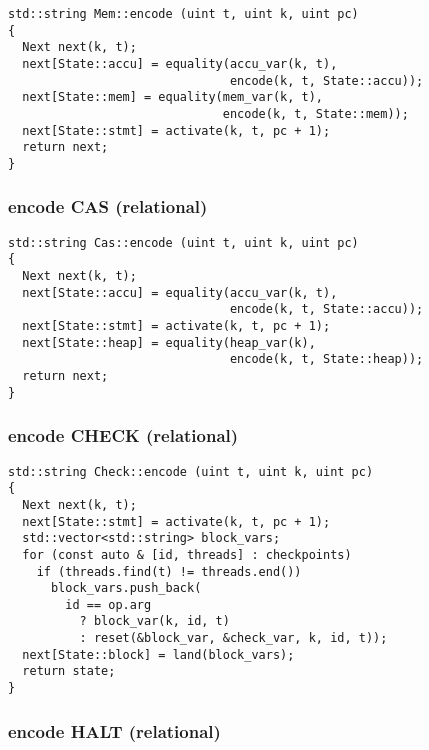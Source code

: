\begin{lstlisting}[style=c++]
std::string Mem::encode (uint t, uint k, uint pc)
{
  Next next(k, t);
  next[State::accu] = equality(accu_var(k, t),
                               encode(k, t, State::accu));
  next[State::mem] = equality(mem_var(k, t),
                              encode(k, t, State::mem));
  next[State::stmt] = activate(k, t, pc + 1);
  return next;
}
\end{lstlisting}

\subsubsection{encode CAS (relational)}

\begin{lstlisting}[style=c++]
std::string Cas::encode (uint t, uint k, uint pc)
{
  Next next(k, t);
  next[State::accu] = equality(accu_var(k, t),
                               encode(k, t, State::accu));
  next[State::stmt] = activate(k, t, pc + 1);
  next[State::heap] = equality(heap_var(k),
                               encode(k, t, State::heap));
  return next;
}
\end{lstlisting}

\subsubsection{encode CHECK (relational)}

\begin{lstlisting}[style=c++]
std::string Check::encode (uint t, uint k, uint pc)
{
  Next next(k, t);
  next[State::stmt] = activate(k, t, pc + 1);
  std::vector<std::string> block_vars;
  for (const auto & [id, threads] : checkpoints)
    if (threads.find(t) != threads.end())
      block_vars.push_back(
        id == op.arg
          ? block_var(k, id, t)
          : reset(&block_var, &check_var, k, id, t));
  next[State::block] = land(block_vars);
  return state;
}
\end{lstlisting}

\subsubsection{encode HALT (relational)}

